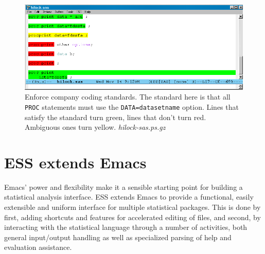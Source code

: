 \documentclass{article}
\newcommand{\stexttt}[1]{{\small\texttt{#1}}}
\begin{document}
\begin{figure}[htbp]
  \centering
  \includegraphics[angle=270,width=\textwidth]{hilock-sas}
  \caption{Enforce company coding
    standards.  The standard here is that all \stexttt{PROC}
    statements must use the \stexttt{DATA=datasetname} option.  Lines
    that satisfy the standard turn green, lines that don't turn red.
    Ambiguous ones turn yellow. \it hilock-sas.ps.gz}
  \label{f.hilock}
\end{figure}

\section{ESS extends Emacs}
\label{sec:ess-extends-emacs}

Emacs' power and flexibility make it a sensible starting point for
building a statistical analysis interface.  ESS extends Emacs to
provide a functional, easily extensible and uniform interface for
multiple statistical packages.  This is done by first, adding
shortcuts and features for accelerated editing of files, and second,
by interacting with the statistical language through a number of
activities, both general input/output handling as well as specialized
parsing of help and evaluation assistance.



\end{document}

